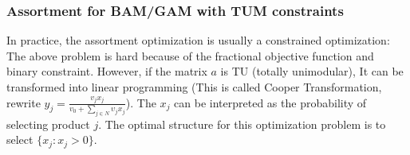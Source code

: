 \documentclass[12pt]{report}
\begin{document}
\subsubsection{Assortment for BAM/GAM with TUM constraints}
In practice, the assortment optimization is usually a constrained optimization:
The above problem is hard because of the fractional objective function and binary constraint. However, if the matrix $a$ is TU (totally unimodular), It can be 
transformed into linear programming (This is called Cooper Transformation, rewrite $y_j=\frac{v_jx_j}{v_0+\sum_{j\in N}\upsilon_jx_j}$).
The $x_j$ can be interpreted as the probability of selecting product $j$. The optimal structure for this optimization problem is to select $\{x_j:x_j>0\}$.
\end{document}

